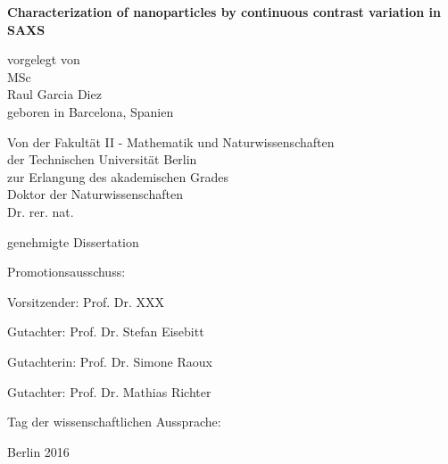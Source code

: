 
\begin{titlepage}
{\noindent\sffamily\large%
    \begin{center}
        \vspace*{3ex}
        {\LARGE\bfseries\sffamily
            Characterization of nanoparticles by continuous contrast variation in SAXS
        }
        \vspace{1cm}

        vorgelegt von \\
        MSc \\
        Raul Garcia Diez \\
        geboren in Barcelona, Spanien \\
        \vspace{4cm}

        Von der Fakultät II - Mathematik und Naturwissenschaften \\
        der Technischen Universität Berlin \\
        zur Erlangung des akademischen Grades \\
        Doktor der Naturwissenschaften \\
        Dr. rer. nat. \\
        \vspace{3ex}

        genehmigte Dissertation \\
        \vspace{2cm}
    \end{center}

    Promotionsausschuss:
    \vspace{2ex}

    Vorsitzender: Prof. Dr. XXX

    Gutachter: Prof. Dr. Stefan Eisebitt

    Gutachterin: Prof. Dr. Simone Raoux

    Gutachter: Prof. Dr. Mathias Richter
    \vspace{1ex}

    Tag der wissenschaftlichen Aussprache:

    \vfill
    \begin{center}
        Berlin 2016
    \end{center}
}
\end{titlepage}

\cleardoublepage

